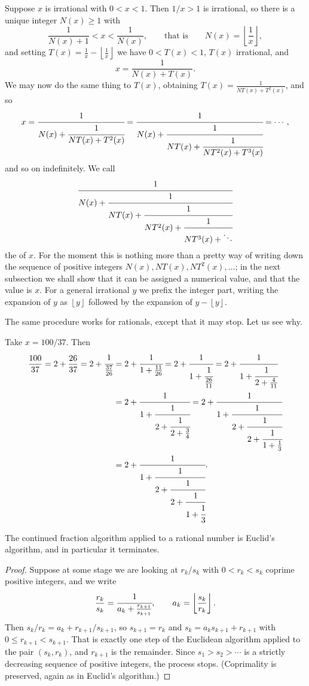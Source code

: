 \documentclass[a4paper]{scrartcl}
\newcommand{\floor}[1]{\left\lfloor #1 \right\rfloor}
\begin{document}
Suppose $x$ is irrational with $0<x<1$. Then $1/x>1$ is irrational, so there is a unique integer $N(x)\geq1$ with
$$\frac{1}{N(x)+1} < x < \frac{1}{N(x)}, \qquad\text{that is}\qquad N(x) = \floor{\frac1x},$$
and setting $T(x) = \frac1x - \floor{\frac1x}$ we have $0<T(x)<1$, $T(x)$ irrational, and
$$x = \frac{1}{N(x)+T(x)}.$$
We may now do the same thing to $T(x)$, obtaining $T(x) = \frac{1}{NT(x)+T^2(x)}$, and so
$$x = \cfrac{1}{N(x)+\cfrac{1}{NT(x)+T^2(x)}} = \cfrac{1}{N(x)+\cfrac{1}{NT(x)+\cfrac{1}{NT^2(x)+T^3(x)}}} = \cdots,$$
and so on indefinitely. We call
$$\cfrac{1}{N(x)+\cfrac{1}{NT(x)+\cfrac{1}{NT^2(x)+\cfrac{1}{NT^3(x)+\ddots}}}}$$
the  of $x$. For the moment this is nothing more than a pretty way of writing down the sequence of positive integers $N(x), NT(x), NT^2(x),\ldots$; in the next subsection we shall show that it can be assigned a numerical value, and that the value is $x$. For a general irrational $y$ we prefix the integer part, writing the expansion of $y$ as $\floor y$ followed by the expansion of $y - \floor y$.

The same procedure works for rationals, except that it may stop. Let us see why.

\begin{example}\label{ex:100over37}
	Take $x = 100/37$. Then
	\begin{align*}
		\frac{100}{37} = 2 + \frac{26}{37} = 2+\cfrac{1}{\frac{37}{26}} &= 2+\cfrac{1}{1+\frac{11}{26}} = 2+\cfrac1{1+\cfrac1{\frac{26}{11}}} = 2+\cfrac1{1+\cfrac1{2+\frac{4}{11}}} \\
		&= 2+\cfrac1{1+\cfrac1{2+\cfrac1{2+\frac34}}} = 2+\cfrac1{1+\cfrac1{2+\cfrac1{2+\cfrac1{1+\frac13}}}} \\
			&= 2+\cfrac1{1+\cfrac1{2+\cfrac1{2+\cfrac1{1+\cfrac13}}}}.
	\end{align*}
\end{example}

\begin{lemma}\label{lem:cf-euclid}
	The continued fraction algorithm applied to a rational number is Euclid's algorithm, and in particular it terminates.
\end{lemma}

\begin{proof}
	Suppose at some stage we are looking at $r_k/s_k$ with $0<r_k<s_k$ coprime positive integers, and we write
	$$\frac{r_k}{s_k} = \cfrac{1}{a_k + \frac{r_{k+1}}{s_{k+1}}}, \qquad a_k = \floor{\frac{s_k}{r_k}}.$$
	Then $s_k/r_k = a_k + r_{k+1}/s_{k+1}$, so $s_{k+1} = r_k$ and $s_k = a_ks_{k+1}+r_{k+1}$ with $0\leq r_{k+1}<s_{k+1}$. That is exactly one step of the Euclidean algorithm applied to the pair $(s_k,r_k)$, and $r_{k+1}$ is the remainder. Since $s_1>s_2>\cdots$ is a strictly decreasing sequence of positive integers, the process stops. (Coprimality is preserved, again as in Euclid's algorithm.)
\end{proof}
\end{document}
